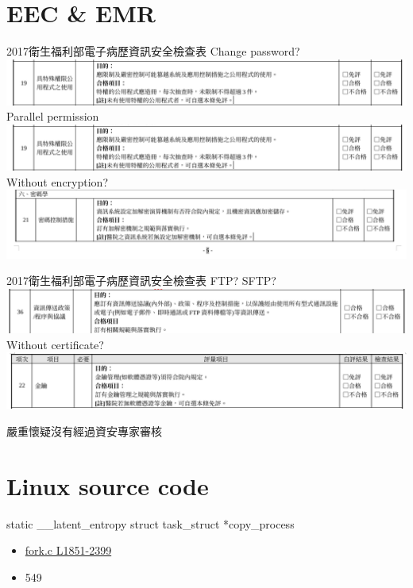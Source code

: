 \documentclass{beamer}
\begin{document}
\begin{CJK*}{UTF8}{bsmi}
    \section{EEC \& EMR}
    \begin{frame}{2017衛生福利部電子病歷資訊安全檢查表}
        Change password?
        \includegraphics[width=\textwidth]{Screenshot_2021-05-11_15-25-16.png}\\
        Parallel permission
        \includegraphics[width=\textwidth]{Screenshot_2021-05-11_15-25-16.png}\\
        Without encryption?
        \includegraphics[width=\textwidth]{Screenshot_2021-05-11_15-23-18.png}
    \end{frame}
    \begin{frame}{2017衛生福利部電子病歷資訊安全檢查表}
        FTP? SFTP?
        \includegraphics[width=\textwidth]{Screenshot_2021-05-11_15-28-25.png}
        Without certificate?
        \includegraphics[width=\textwidth]{Screenshot_2021-05-11_15-24-16.png}
    \end{frame}

    \begin{frame}
        \centering
        \Large
        嚴重懷疑沒有經過資安專家審核
    \end{frame}

    \section{Linux source code}
    \begin{frame}
        static \_\_latent\_entropy struct task\_struct *copy\_process
        \begin{itemize}
            \item \href{https://github.com/torvalds/linux/blob/master/kernel/fork.c\#L1851-L2399}{fork.c L1851-2399}
            \item 549
        \end{itemize}


\end{frame}
\end{CJK*}
\end{document}
